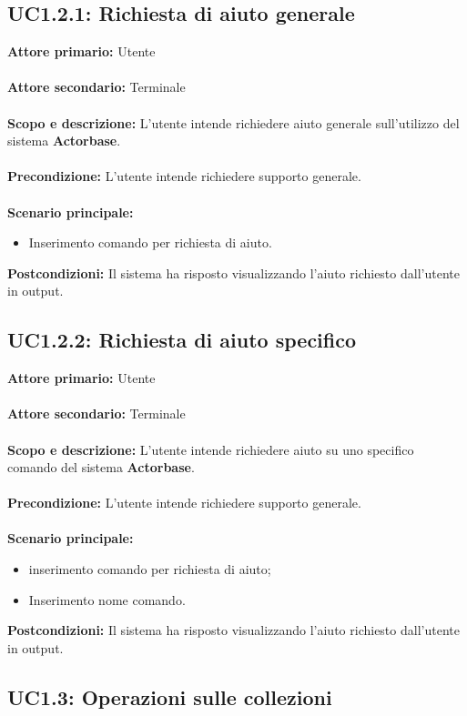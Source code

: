 \documentclass{scalatekids-article}
\begin{document}
\subsection{UC1.2.1: Richiesta di aiuto generale}

\textbf{Attore primario:} Utente\\ \\
\textbf{Attore secondario:} Terminale\\ \\
\textbf{Scopo e descrizione:} L'utente intende richiedere aiuto generale sull'utilizzo del sistema \textbf{Actorbase}.\\ \\
\textbf{Precondizione:} L'utente intende richiedere supporto generale.\\ \\
\textbf{Scenario principale:}
\begin{itemize}
\item Inserimento comando per richiesta di aiuto.
\end{itemize}
\textbf{Postcondizioni:} Il sistema ha risposto visualizzando l'aiuto richiesto dall'utente in output.

\subsection{UC1.2.2: Richiesta di aiuto specifico}

\textbf{Attore primario:} Utente\\ \\
\textbf{Attore secondario:} Terminale\\ \\
\textbf{Scopo e descrizione:} L'utente intende richiedere aiuto su uno specifico comando del sistema \textbf{Actorbase}.\\ \\
\textbf{Precondizione:} L'utente intende richiedere supporto generale.\\ \\
\textbf{Scenario principale:}
\begin{itemize}
\item inserimento comando per richiesta di aiuto;
\item Inserimento nome comando.
\end{itemize}
\textbf{Postcondizioni:} Il sistema ha risposto visualizzando l'aiuto richiesto dall'utente in output.

\subsection{UC1.3: Operazioni sulle collezioni}
\end{document}
